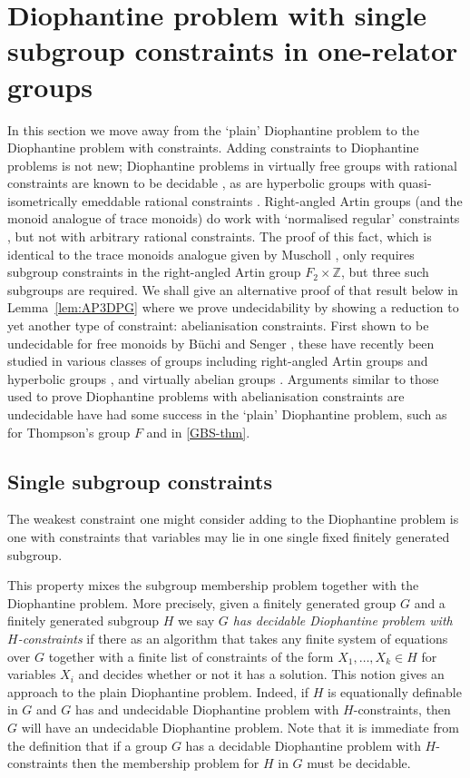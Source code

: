 \documentclass[11pt]{amsart}
\theoremstyle{definition}
\numberwithin{theorem}{section}
\newcommand{\Z}{\mathbb{Z}}
\begin{document}
\section{Diophantine problem with single subgroup constraints in one-relator groups}
\label{sec:subgroup-constraints}

In this section we move away from the `plain' Diophantine problem to the Diophantine problem with constraints. Adding constraints to Diophantine problems is not new; Diophantine problems in virtually free groups with rational constraints are known to be decidable \cite{dahmani_guirardel}, as are hyperbolic groups with quasi-isometrically emeddable rational constraints \cite{dahmani_guirardel}. Right-angled Artin groups (and the monoid analogue of trace monoids) do work with `normalised regular' constraints \cite{DiekertMuscholl}, but not with arbitrary rational constraints. The proof of this fact, which is identical to the trace monoids analogue given by Muscholl \cite{MuschollThesis}, only requires subgroup constraints in the right-angled Artin group \(F_2 \times \Z\), but three such subgroups are required. We shall give an alternative proof of that result below in Lemma~\ref{lem:AP3DPG} where we prove undecidability by showing a reduction to yet another type of constraint: abelianisation constraints. First shown to be undecidable for free monoids by B\"{u}chi and Senger \cite{BuchiSenger}, these have recently been studied in various classes of groups including right-angled Artin groups and hyperbolic groups \cite{CiobanuGarreta}, and virtually abelian groups \cite{CiobanuEvettsLevine}. Arguments similar to those used to prove Diophantine problems with abelianisation constraints are undecidable have had some success in the `plain' Diophantine problem, such as for Thompson's group \(F\) \cite{ElliottLevine} and in \cref{GBS-thm}.

\subsection*{Single subgroup constraints}
The weakest constraint one might consider adding to the Diophantine problem is one with constraints that variables may lie in one single fixed finitely generated subgroup. 

This property mixes the subgroup membership problem together with the Diophantine problem. More precisely, given a finitely generated group $G$ and a finitely generated subgroup $H$ we say \emph{$G$ has decidable Diophantine problem with $H$-constraints} if there as an algorithm that takes any finite system of equations over $G$ together with a finite list of constraints of the form $X_1, \ldots, X_k \in H$ for variables $X_i$ and decides whether or not it has a solution. This notion gives an approach to the plain Diophantine problem. Indeed, if $H$ is equationally definable in $G$ and $G$ has and undecidable Diophantine problem with $H$-constraints, then $G$ will have an  undecidable Diophantine problem. Note that it is immediate from the definition that if a group $G$ has a decidable Diophantine problem with $H$-constraints then the membership problem for $H$ in $G$ must be decidable.   
\end{document}
